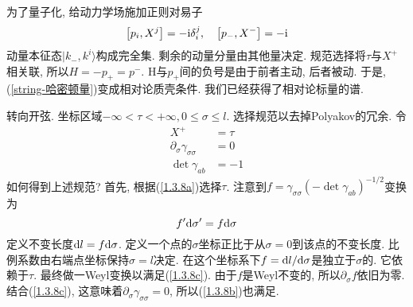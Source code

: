 为了量子化, 给动力学场施加正则对易子
\begin{equation}
\left[p_{i}, X^{j}\right]=-\mathrm{i} \delta_{i}^{j}, \quad\left[p_{-}, X^{-}\right]=-\mathrm{i}
\end{equation}
动量本征态$|k_-,k^i\rangle$构成完全集. 剩余的动量分量由其他量决定. 规范选择将$\tau$与$X^+$相关联, 所以$H=-p_+ =p^-$. H与$p_+$间的负号是由于前者主动, 后者被动. 于是, (\ref{string-哈密顿量})变成相对论质壳条件. 我们已经获得了相对论标量的谱. 

转向开弦. 坐标区域$-\infty<\tau<+\infty, 0\leq \sigma\leq l$. 选择规范以去掉Polyakov的冗余. 令
\begin{subequations} 
\begin{align} 
X^+&=\tau \label{1.3.8a} \\
\partial_{\sigma} \gamma_{\sigma \sigma}&=0 \label{1.3.8b} \\
\operatorname{det} \gamma_{a b}&=-1 \label{1.3.8c}
\end{align}   \label{1.3.8}
\end{subequations}
如何得到上述规范? 首先, 根据(\ref{1.3.8a})选择$\tau$. 注意到$f=\gamma_{\sigma \sigma}\left(-\operatorname{det} \gamma_{a b}\right)^{-1 / 2}$变换为
\begin{equation}
f^{\prime} \mathrm{d} \sigma^{\prime}=f \mathrm{d} \sigma
\end{equation}
定义不变长度$\mathrm{d} l=f\mathrm{d} \sigma$. 定义一个点的$\sigma$坐标正比于从$\sigma=0$到该点的不变长度. 比例系数由右端点坐标保持$\sigma=l$决定. 在这个坐标系下$f=\mathrm{d} l/\mathrm{d} \sigma$是独立于$\sigma$的. 它依赖于$\tau$. 
最终做一Weyl变换以满足(\ref{1.3.8c}). 由于$f$是Weyl不变的, 所以$\partial_\sigma f$依旧为零. 结合(\ref{1.3.8c}), 这意味着$\partial_{\sigma} \gamma_{\sigma \sigma}=0$, 所以(\ref{1.3.8b})也满足. 

